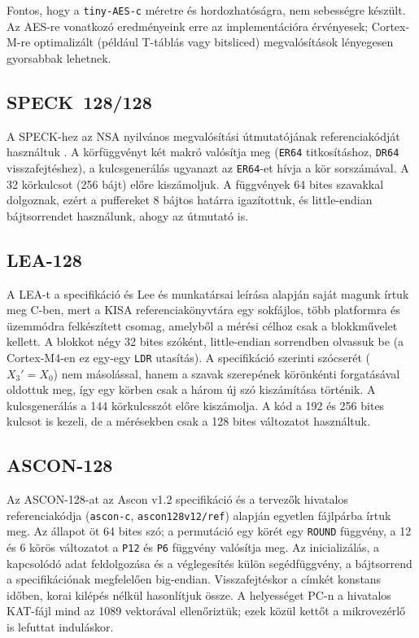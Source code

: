 \documentclass[a4paper,12pt]{report}
\theoremstyle{definition}
\theoremstyle{remark}
\begin{document}
Fontos, hogy a \texttt{tiny-AES-c} méretre és hordozhatóságra, nem sebességre készült. Az AES-re vonatkozó eredményeink erre az implementációra érvényesek; Cortex-M-re optimalizált (például T-táblás vagy bitsliced) megvalósítások lényegesen gyorsabbak lehetnek.

\subsection{SPECK~128/128}

A SPECK-hez az NSA nyilvános megvalósítási útmutatójának referenciakódját használtuk \cite{Beaulieu2019}. A körfüggvényt két makró valósítja meg (\texttt{ER64} titkosításhoz, \texttt{DR64} visszafejtéshez), a kulcsgenerálás ugyanazt az \texttt{ER64}-et hívja a kör sorszámával. A 32 körkulcsot (256 bájt) előre kiszámoljuk. A függvények 64 bites szavakkal dolgoznak, ezért a puffereket 8 bájtos határra igazítottuk, és little-endian bájtsorrendet használunk, ahogy az útmutató is.

\subsection{LEA-128}

A LEA-t a specifikáció \cite{Hong2013} és Lee és munkatársai leírása \cite{Lee2014} alapján saját magunk írtuk meg C-ben, mert a KISA referenciakönyvtára egy sokfájlos, több platformra és üzemmódra felkészített csomag, amelyből a mérési célhoz csak a blokkművelet kellett. A blokkot négy 32 bites szóként, little-endian sorrendben olvassuk be (a Cortex-M4-en ez egy-egy \texttt{LDR} utasítás). A specifikáció szerinti szócserét ($X_3' = X_0$) nem másolással, hanem a szavak szerepének körönkénti forgatásával oldottuk meg, így egy körben csak a három új szó kiszámítása történik. A kulcsgenerálás a 144 körkulcsszót előre kiszámolja. A kód a 192 és 256 bites kulcsot is kezeli, de a mérésekben csak a 128 bites változatot használtuk.

\subsection{ASCON-128}

Az ASCON-128-at az Ascon v1.2 specifikáció \cite{Dobraunig2021} és a tervezők hivatalos referenciakódja (\texttt{ascon-c}, \texttt{ascon128v12/ref}) \cite{AsconC} alapján egyetlen fájlpárba írtuk meg. Az állapot öt 64 bites szó; a permutáció egy körét egy \texttt{ROUND} függvény, a 12 és 6 körös változatot a \texttt{P12} és \texttt{P6} függvény valósítja meg. Az inicializálás, a kapcsolódó adat feldolgozása és a véglegesítés külön segédfüggvény, a bájtsorrend a specifikációnak megfelelően big-endian. Visszafejtéskor a címkét konstans időben, korai kilépés nélkül hasonlítjuk össze. A helyességet PC-n a hivatalos KAT-fájl mind az 1089 vektorával ellenőriztük; ezek közül kettőt a mikrovezérlő is lefuttat induláskor.
\end{document}
